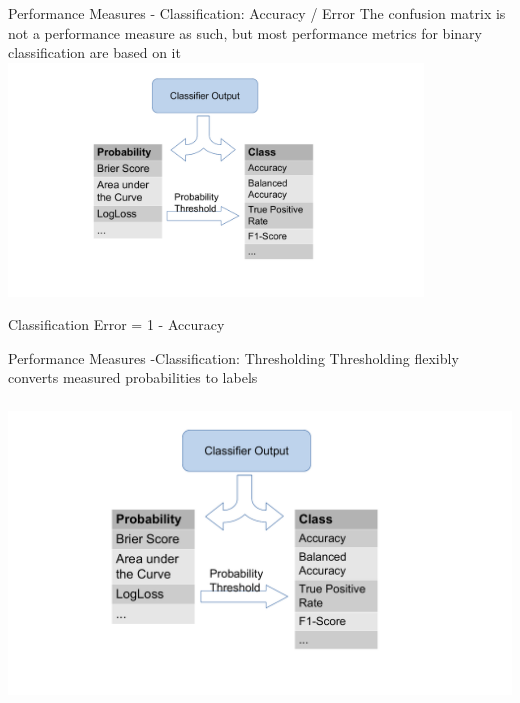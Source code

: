 \begin{frame}{Performance Measures - Classification: Accuracy / Error}
The confusion matrix is not a performance measure as such, but most
performance metrics for binary classification are based on it
\newline
\hspace{2cm}\includegraphics[width=11cm,page=4]{plots/confusion_matrix_measures.pdf}

Classification Error = 1 - Accuracy
\end{frame}


\begin{frame}{Performance Measures -Classification: Thresholding}
Thresholding flexibly converts measured probabilities to labels

\begin{centering}
\includegraphics[height=8cm, width=14cm,page=2]{plots/confusion_matrix_measures.pdf}
\end{centering}
\end{frame}


